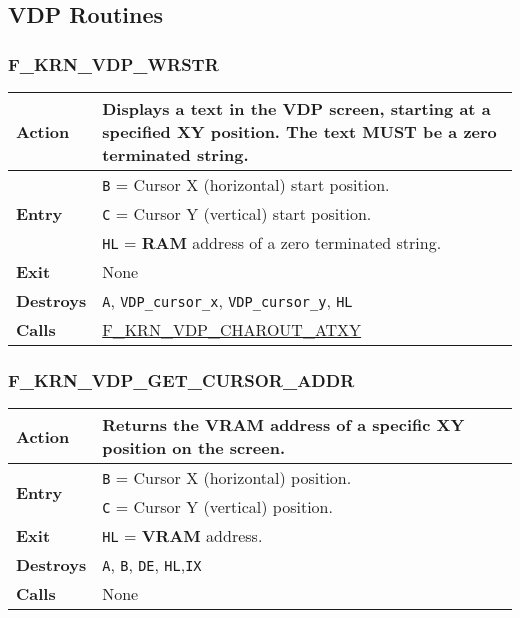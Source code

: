 \subsection{VDP Routines}

    \subsubsection{F\_KRN\_VDP\_WRSTR}
    \label{func:fkrnvdpwrstr}
    \begin{tabular}{l p{15cm}}
        \hline\textbf{Action}
        & Displays a text in the VDP screen, starting at a specified XY
        position. The text MUST be a zero terminated string. \\
        \hline\multirow[t]{3}{4em}{\textbf{Entry}}
        & \texttt{B} = Cursor X (horizontal) start position.\\
        & \texttt{C} = Cursor Y (vertical) start position.\\
        & \texttt{HL} = \textbf{RAM} address of a zero terminated string.\\
        \hline\textbf{Exit} & None\\
        \hline\textbf{Destroys} & \texttt{A}, \texttt{VDP\_cursor\_x},
            \texttt{VDP\_cursor\_y}, \texttt{HL} \\
        \hline\textbf{Calls} & 
        \hyperref[func:fkrnvdpcharoutatxy]{F\_KRN\_VDP\_CHAROUT\_ATXY}\\
        \hline
    \end{tabular}

    \subsubsection{F\_KRN\_VDP\_GET\_CURSOR\_ADDR}
    \label{func:fkrnvdpgetcursoraddr}
    \begin{tabular}{l p{15cm}}
        \hline\textbf{Action}
        & Returns the \textbf{VRAM} address of a specific XY position on the
        screen. \\
        \hline\multirow[t]{2}{4em}{\textbf{Entry}}
        & \texttt{B} = Cursor X (horizontal) position.\\
        & \texttt{C} = Cursor Y (vertical) position.\\
        \hline\textbf{Exit} & \texttt{HL} = \textbf{VRAM} address.\\
        \hline\textbf{Destroys} & \texttt{A}, \texttt{B}, \texttt{DE},
            \texttt{HL},\texttt{IX} \\
        \hline\textbf{Calls} & None \\
        \hline
    \end{tabular}

